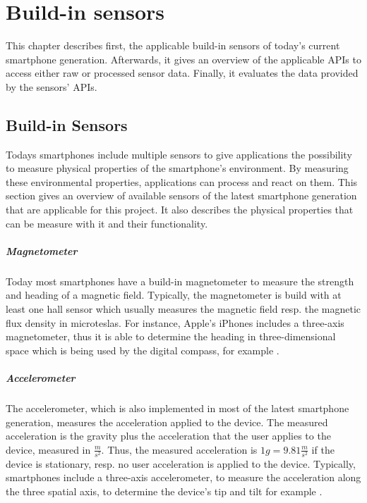 \chapter{Build-in sensors} \label{chap:sensors} %

This chapter describes first, the applicable build-in sensors of today's current smartphone generation.
Afterwards, it gives an overview of the applicable \acsp{API} to access either raw or processed sensor data.
Finally, it evaluates the data provided by the sensors' \acsp{API}.


\section{Build-in Sensors}

Todays smartphones include multiple sensors to give applications the possibility to measure physical properties of the smartphone's environment.
By measuring these environmental properties, applications can process and react on them.
This section gives an overview of available sensors of the latest smartphone generation that are applicable for this project.
It also describes the physical properties that can be measure with it and their functionality.


\paragraph{Magnetometer}

Today most smartphones have a build-in magnetometer to measure the strength and heading of a magnetic field.
Typically, the magnetometer is build with at least one hall sensor which usually measures the magnetic field resp. the magnetic flux density in microteslas.
For instance, Apple's iPhones includes a three-axis magnetometer, thus it is able to determine the heading in three-dimensional space which is being used by the digital compass, for example \cite{apple:ios_doc_cm, apple:wwdc_2012_pham}.


\paragraph{Accelerometer}

The accelerometer, which is also implemented in most of the latest smartphone generation, measures the acceleration applied to the device.
The measured acceleration is the gravity plus the acceleration that the user applies to the device, measured in $\frac{m}{s^2}$.
Thus, the measured acceleration is $1g = 9.81 \frac{m}{s^2}$ if the device is stationary, resp. no user acceleration is applied to the device.
Typically, smartphones include a three-axis accelerometer, to measure the acceleration along the three spatial axis, to determine the device's tip and tilt for example \cite{apple:ios_doc_cm, apple:wwdc_2012_pham}.

